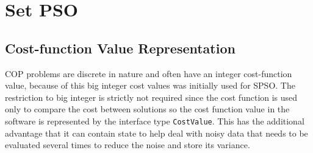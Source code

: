 \documentclass[a4paper,oneside,english]{book}
\numberwithin{equation}{section}
\numberwithin{figure}{section}
\begin{document}
\section{Set PSO}
\subsection{Cost-function Value Representation}   
COP problems are discrete in nature and often have an integer cost-function value, because of this big integer cost values was initially used for SPSO.  The restriction to big integer is strictly not required since the cost function is used only to compare the cost between solutions so the cost function value in the software is represented by the interface type \texttt{CostValue}. This has the additional advantage that it can contain state to help deal with noisy data that needs to be evaluated several times to reduce the noise and store its variance.
\end{document}
